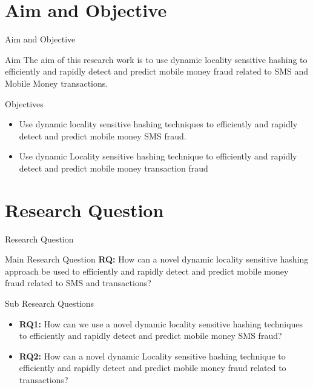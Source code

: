 \documentclass[11pt,aspectratio=169]{beamer}
\begin{document}
		\section{Aim and Objective}
			\begin{frame}{ Aim and Objective}
				
				\begin{block}{Aim}
					The aim of this research work is to use dynamic locality sensitive hashing to  efficiently and rapidly detect and predict mobile money fraud related to SMS and Mobile Money transactions.
				\end{block}
		
				\begin{block}{Objectives}
					\begin{itemize}
						\item Use  dynamic locality sensitive hashing techniques to efficiently and rapidly detect and predict mobile money SMS fraud.
						
						\item Use dynamic Locality sensitive hashing technique to efficiently and rapidly detect and predict mobile money transaction fraud
						
					\end{itemize}
				\end{block}
				
				
				
			\end{frame}
		
		
	\section{Research Question}
		\begin{frame}{\centering Research Question}
			\begin{block}{Main Research Question}
				\textbf{RQ:} How can a novel dynamic locality sensitive hashing approach be used to efficiently and rapidly detect and predict mobile money fraud related to SMS and transactions?
				
			\end{block}
			
			\begin{block}{Sub Research Questions}
				\begin{itemize}
					\item \textbf{RQ1:}  How can we use a novel dynamic locality sensitive hashing techniques to efficiently and rapidly detect and predict mobile money SMS fraud? 
					
					
					\item \textbf{RQ2:}  How can a novel dynamic Locality sensitive hashing technique to efficiently and rapidly detect and predict mobile money fraud related to transactions? 
					
					
				\end{itemize}
			\end{block}
		\end{frame}
		
\end{document}
